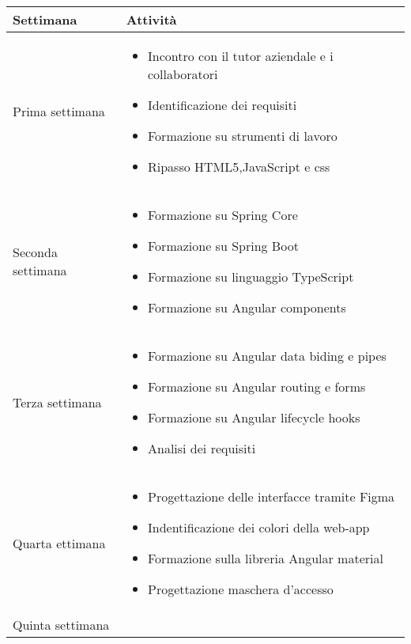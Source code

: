 \begin{center}
    \renewcommand{\arraystretch}{1.5}
    \begin{longtable}{ |p{3cm}|p{9cm}|  }
        \hline
        Settimana&Attività \\
        \hline
        \endhead
        Prima settimana&\begin{itemize}
            \item Incontro con il tutor aziendale e i collaboratori
            \item Identificazione dei requisiti
            \item Formazione su strumenti di lavoro
            \item Ripasso HTML5,JavaScript e css
        \end{itemize}\\
        Seconda settimana& \begin{itemize}
            \item Formazione su Spring Core
            \item Formazione su Spring Boot
            \item Formazione su linguaggio TypeScript
            \item Formazione su Angular components
        \end{itemize}\\ 
        Terza settimana&\begin{itemize}
            \item Formazione su Angular data biding e pipes
            \item Formazione su Angular routing e forms
            \item Formazione su Angular lifecycle hooks
            \item Analisi dei requisiti
        \end{itemize}\\
        Quarta ettimana&\begin{itemize}
            \item Progettazione delle interfacce tramite Figma
            \item Indentificazione dei colori della web-app
            \item Formazione sulla libreria Angular material
            \item Progettazione maschera d'accesso
        \end{itemize}\\
        Quinta settimana&\begin{itemize}

\end{itemize}
\end{longtable}
\end{center}
